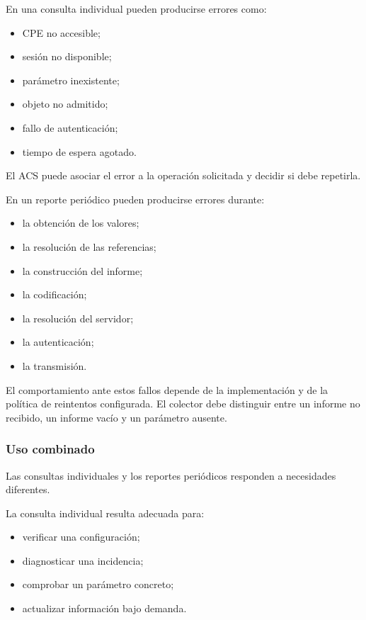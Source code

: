 En una consulta individual pueden producirse errores como:

\begin{itemize}
    \item CPE no accesible;
    \item sesión no disponible;
    \item parámetro inexistente;
    \item objeto no admitido;
    \item fallo de autenticación;
    \item tiempo de espera agotado.
\end{itemize}

El ACS puede asociar el error a la operación solicitada y decidir si debe
repetirla.

En un reporte periódico pueden producirse errores durante:

\begin{itemize}
    \item la obtención de los valores;
    \item la resolución de las referencias;
    \item la construcción del informe;
    \item la codificación;
    \item la resolución del servidor;
    \item la autenticación;
    \item la transmisión.
\end{itemize}

El comportamiento ante estos fallos depende de la implementación y de la
política de reintentos configurada. El colector debe distinguir entre un
informe no recibido, un informe vacío y un parámetro ausente.


\subsubsection*{Uso combinado}

Las consultas individuales y los reportes periódicos responden a
necesidades diferentes.

La consulta individual resulta adecuada para:

\begin{itemize}
    \item verificar una configuración;
    \item diagnosticar una incidencia;
    \item comprobar un parámetro concreto;
    \item actualizar información bajo demanda.
\end{itemize}

